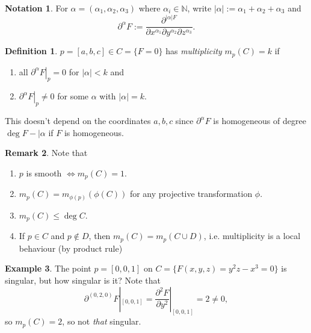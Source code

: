 \documentclass{article}
\newcommand{\N}{\mathbb{N}}
\theoremstyle{definition}
\newtheorem{defn}{Definition}[subsection]
\newtheorem{example}[defn]{Example}
\newtheorem{remark}[defn]{Remark}
\newtheorem*{notation}{Notation}
\begin{document}
\begin{notation}
For $\alpha=(\alpha_1,\alpha_2,\alpha_3)$ where $\alpha_i\in\N$, write $|\alpha|:=\alpha_1+\alpha_2+\alpha_3$ and
\[
\partial^\alpha F:=\frac{\partial^{|\alpha|F}}{\partial x^{\alpha_1}\partial y^{\alpha_2}\partial z^{\alpha_3}}.
\]
\end{notation}
\begin{defn}
$p=[a,b,c]\in C=\{F=0\}$ has \textit{multiplicity} $m_p(C)=k$ if
\begin{enumerate}
\item all $\left.\partial^\alpha F\right|_p=0$ for $|\alpha|<k$ and
\item $\left.\partial^\alpha F\right|_p\neq 0$ for some $\alpha$ with $|\alpha|=k$.
\end{enumerate}
\end{defn}
This doesn't depend on the coordinates $a,b,c$ since $\partial^\alpha F$ is homogeneous of degree $\deg F-|\alpha$ if $F$ is homogeneous.

\begin{remark}
Note that
\begin{enumerate}
\item $p$ is smooth $\iff m_p(C)=1$.
\item $m_p(C)=m_{\phi(p)}(\phi(C))$ for any projective transformation $\phi$.
\item $m_p(C)\leq \deg C$.
\item If $p\in C$ and $p\notin D$, then $m_p(C)=m_p(C\cup D)$, i.e. multiplicity is a local behaviour (by product rule)
\end{enumerate}
\end{remark}

\begin{example}
The point $p=[0,0,1]$ on $C=\{F(x,y,z)=y^2z-x^3=0\}$ is singular, but how singular is it? Note that
\[
\partial^{(0,2,0)}F|_{[0,0,1]}=\frac{\partial^2F}{\partial y^2}|_{[0,0,1]}=2\neq 0,
\]
so $m_p(C)=2$, so not \textit{that} singular.
\end{example}
\end{document}

